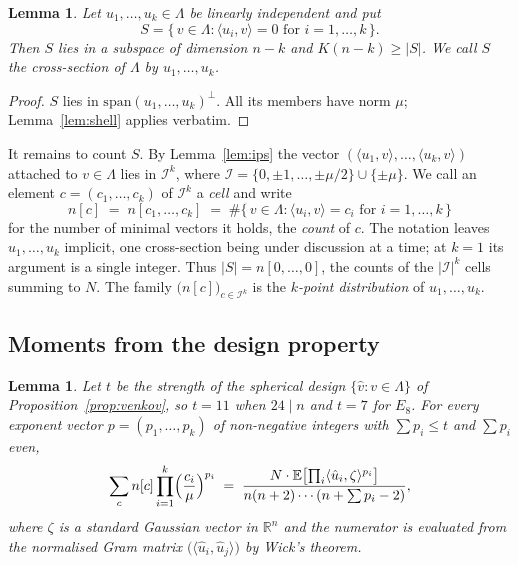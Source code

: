 \documentclass[11pt]{amsart}
\newtheorem{lemma}[theorem]{Lemma}
\theoremstyle{remark}
\newcommand{\ip}[2]{\langle #1,#2\rangle}
\newcommand{\R}{\mathbb{R}}
\begin{document}
\begin{lemma}\label{lem:cross}
Let $u_1,\dots,u_k\in\Lambda$ be linearly independent and put
\[
  S=\{\,v\in\Lambda : \ip{u_i}{v}=0 \text{ for } i=1,\dots,k\,\}.
\]
Then $S$ lies in a subspace of dimension $n-k$ and $K(n-k)\ge|S|$. We call $S$
the \emph{cross-section} of $\Lambda$ by $u_1,\dots,u_k$.
\end{lemma}

\begin{proof}
$S$ lies in $\mathrm{span}(u_1,\dots,u_k)^\perp$. All its members have norm
$\mu$; Lemma~\ref{lem:shell} applies verbatim.
\end{proof}

It remains to count $S$. By Lemma~\ref{lem:ips} the vector
$(\ip{u_1}{v},\dots,\ip{u_k}{v})$ attached to $v\in\Lambda$ lies in
$\mathcal I^k$, where $\mathcal I=\{0,\pm1,\dots,\pm\mu/2\}\cup\{\pm\mu\}$. We
call an element $c=(c_1,\dots,c_k)$ of $\mathcal I^k$ a \emph{cell} and write
\[
  n[c]\;=\;n[c_1,\dots,c_k]
  \;=\;\#\{\,v\in\Lambda : \ip{u_i}{v}=c_i \text{ for } i=1,\dots,k\,\}
\]
for the number of minimal vectors it holds, the \emph{count} of $c$. The notation
leaves $u_1,\dots,u_k$ implicit, one cross-section being under discussion at a
time; at $k=1$ its argument is a single integer. Thus $|S|=n[0,\dots,0]$, the
counts of the $|\mathcal I|^k$ cells summing to $N$. The family
$\bigl(n[c]\bigr)_{c\in\mathcal I^k}$ is the \emph{$k$-point
distribution} of $u_1,\dots,u_k$.

\subsection{Moments from the design property}

\begin{lemma}\label{lem:moments}
Let $t$ be the strength of the spherical design $\{\hat v:v\in\Lambda\}$ of
Proposition~\ref{prop:venkov}, so $t=11$ when $24\mid n$ and $t=7$ for $E_8$. For
every exponent vector $p=(p_1,\dots,p_k)$ of non-negative integers with
$\sum p_i\le t$ and $\sum p_i$ even,
\begin{equation}\label{eq:moment}
  \sum_{c} n[c]\prod_{i=1}^{k}\Bigl(\frac{c_i}{\mu}\Bigr)^{p_i}
  \;=\;
  \frac{N\cdot \mathbb{E}\bigl[\prod_i \ip{\hat u_i}{\zeta}^{p_i}\bigr]}
       {n(n+2)\cdots(n+\textstyle\sum p_i-2)},
\end{equation}
where $\zeta$ is a standard Gaussian vector in $\R^n$ and the numerator is
evaluated from the normalised Gram matrix $\bigl(\ip{\hat u_i}{\hat u_j}\bigr)$
by Wick's theorem.
\end{lemma}
\end{document}
